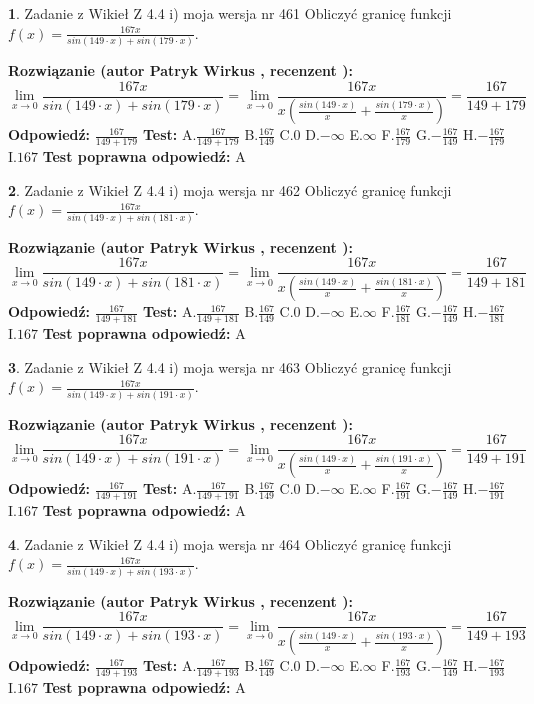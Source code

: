 \documentclass[12pt, a4paper]{article}
\theoremstyle{definition} %
\newtheorem{zad}{}
\newcommand{\zadStart}[1]{\begin{zad}#1\newline}
\newcommand{\zadStop}{\end{zad}}
\newcommand{\rozwStart}[2]{\noindent \textbf{Rozwiązanie (autor #1 , recenzent #2): }\newline}
\newcommand{\rozwStop}{\newline}
\newcommand{\odpStart}{\noindent \textbf{Odpowiedź:}\newline}
\newcommand{\odpStop}{\newline}
\newcommand{\testStart}{\noindent \textbf{Test:}\newline}
\newcommand{\testStop}{\newline}
\newcommand{\kluczStart}{\noindent \textbf{Test poprawna odpowiedź:}\newline}
\newcommand{\kluczStop}{\newline}
\begin{document}
\zadStart{Zadanie z Wikieł Z 4.4 i) moja wersja nr 461}
Obliczyć granicę funkcji $f(x)=\frac{167x}{sin(149\cdot x) +sin(179\cdot x)}$.
\zadStop
\rozwStart{Patryk Wirkus}{}
$$\lim\limits_{x\to 0}\frac{167x}{sin(149\cdot x) +sin(179\cdot x)}=\lim\limits_{x\to 0}\frac{167x}{x(\frac{sin(149\cdot x)}{x}+\frac{sin(179\cdot x)}{x})}=\frac{167}{149+179}$$
\rozwStop
\odpStart
$\frac{167}{149+179}$
\odpStop
\testStart
A.$\frac{167}{149+179}$
B.$\frac{167}{149}$
C.$0$
D.$-\infty$
E.$\infty$
F.$\frac{167}{179}$
G.$-\frac{167}{149}$
H.$-\frac{167}{179}$
I.$167$
\testStop
\kluczStart
A
\kluczStop



\zadStart{Zadanie z Wikieł Z 4.4 i) moja wersja nr 462}
Obliczyć granicę funkcji $f(x)=\frac{167x}{sin(149\cdot x) +sin(181\cdot x)}$.
\zadStop
\rozwStart{Patryk Wirkus}{}
$$\lim\limits_{x\to 0}\frac{167x}{sin(149\cdot x) +sin(181\cdot x)}=\lim\limits_{x\to 0}\frac{167x}{x(\frac{sin(149\cdot x)}{x}+\frac{sin(181\cdot x)}{x})}=\frac{167}{149+181}$$
\rozwStop
\odpStart
$\frac{167}{149+181}$
\odpStop
\testStart
A.$\frac{167}{149+181}$
B.$\frac{167}{149}$
C.$0$
D.$-\infty$
E.$\infty$
F.$\frac{167}{181}$
G.$-\frac{167}{149}$
H.$-\frac{167}{181}$
I.$167$
\testStop
\kluczStart
A
\kluczStop



\zadStart{Zadanie z Wikieł Z 4.4 i) moja wersja nr 463}
Obliczyć granicę funkcji $f(x)=\frac{167x}{sin(149\cdot x) +sin(191\cdot x)}$.
\zadStop
\rozwStart{Patryk Wirkus}{}
$$\lim\limits_{x\to 0}\frac{167x}{sin(149\cdot x) +sin(191\cdot x)}=\lim\limits_{x\to 0}\frac{167x}{x(\frac{sin(149\cdot x)}{x}+\frac{sin(191\cdot x)}{x})}=\frac{167}{149+191}$$
\rozwStop
\odpStart
$\frac{167}{149+191}$
\odpStop
\testStart
A.$\frac{167}{149+191}$
B.$\frac{167}{149}$
C.$0$
D.$-\infty$
E.$\infty$
F.$\frac{167}{191}$
G.$-\frac{167}{149}$
H.$-\frac{167}{191}$
I.$167$
\testStop
\kluczStart
A
\kluczStop



\zadStart{Zadanie z Wikieł Z 4.4 i) moja wersja nr 464}
Obliczyć granicę funkcji $f(x)=\frac{167x}{sin(149\cdot x) +sin(193\cdot x)}$.
\zadStop
\rozwStart{Patryk Wirkus}{}
$$\lim\limits_{x\to 0}\frac{167x}{sin(149\cdot x) +sin(193\cdot x)}=\lim\limits_{x\to 0}\frac{167x}{x(\frac{sin(149\cdot x)}{x}+\frac{sin(193\cdot x)}{x})}=\frac{167}{149+193}$$
\rozwStop
\odpStart
$\frac{167}{149+193}$
\odpStop
\testStart
A.$\frac{167}{149+193}$
B.$\frac{167}{149}$
C.$0$
D.$-\infty$
E.$\infty$
F.$\frac{167}{193}$
G.$-\frac{167}{149}$
H.$-\frac{167}{193}$
I.$167$
\testStop
\kluczStart
A
\kluczStop
\end{document}
